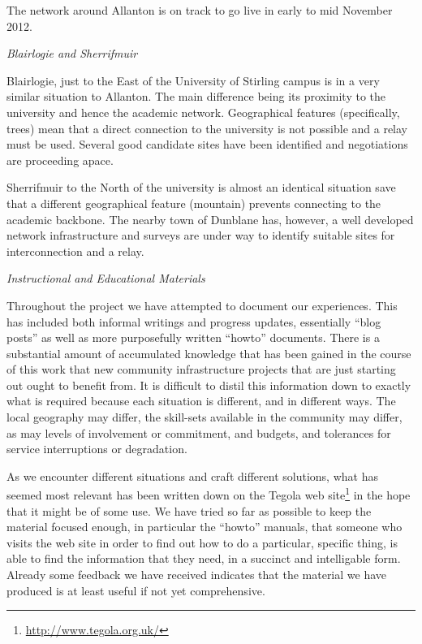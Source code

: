 \documentclass[a4paper,conference,onecolumn]{IEEEtran}
\renewcommand{\subsection}[1]{%
  \vspace{\lineskip}%
  \begin{center}%
    \textit{#1}%
  \end{center}%
  \vspace{\lineskip}%
}
\begin{document}
The network around Allanton is on track to go live in early to mid
November 2012.

\subsection{Blairlogie and Sherrifmuir}

Blairlogie, just to the East of the University of Stirling campus is
in a very similar situation to Allanton. The main difference being its
proximity to the university and hence the academic
network. Geographical features (specifically, trees) mean that a
direct connection to the university is not possible and a relay must
be used. Several good candidate sites have been identified and
negotiations are proceeding apace.

Sherrifmuir to the North of the university is almost an identical
situation save that a different geographical feature (mountain)
prevents connecting to the academic backbone. The nearby town of
Dunblane has, however, a well developed network infrastructure and
surveys are under way to identify suitable sites for interconnection
and a relay.

\subsection{Instructional and Educational Materials}

Throughout the project we have attempted to document our experiences. 
This has included both informal writings and progress updates,
essentially ``blog posts'' as well as more purposefully written
``howto'' documents. There is a substantial amount of accumulated
knowledge that has been gained in the course of this work that new
community infrastructure projects that are just starting out ought to
benefit from. It is difficult to distil this information down to
exactly what is required because each situation is different, and in
different ways. The local geography may differ, the skill-sets
available in the community may differ, as may levels of involvement or
commitment, and budgets, and tolerances for service interruptions or
degradation.

As we encounter different situations and craft different solutions,
what has seemed most relevant has been written down on the Tegola web
site\footnote{\url{http://www.tegola.org.uk/}} in the hope that it
might be of some use. We have tried so far as possible to keep the
material focused enough, in particular the ``howto'' manuals, that
someone who visits the web site in order to find out how to do a
particular, specific thing, is able to find the information that they
need, in a succinct and intelligable form. Already some feedback we
have received indicates that the material we have produced is at least
useful if not yet comprehensive. 
\end{document}
